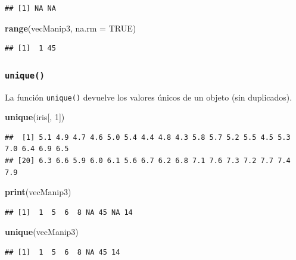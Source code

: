 \documentclass[
]{book}
\newenvironment{Shaded}{\begin{snugshade}}{\end{snugshade}}
\newcommand{\DataTypeTok}[1]{\textcolor[rgb]{0.13,0.29,0.53}{#1}}
\newcommand{\DecValTok}[1]{\textcolor[rgb]{0.00,0.00,0.81}{#1}}
\newcommand{\KeywordTok}[1]{\textcolor[rgb]{0.13,0.29,0.53}{\textbf{#1}}}
\newcommand{\NormalTok}[1]{#1}
\newcommand{\OtherTok}[1]{\textcolor[rgb]{0.56,0.35,0.01}{#1}}
\begin{document}
\begin{verbatim}
## [1] NA NA
\end{verbatim}

\begin{Shaded}
\begin{Highlighting}[]
\KeywordTok{range}\NormalTok{(vecManip3, }\DataTypeTok{na.rm =} \OtherTok{TRUE}\NormalTok{)}
\end{Highlighting}
\end{Shaded}

\begin{verbatim}
## [1]  1 45
\end{verbatim}

\hypertarget{l015unique}{%
\subsubsection{\texorpdfstring{\texttt{unique()}}{unique()}}\label{l015unique}}

La función \texttt{unique()} devuelve los valores únicos de un objeto (sin duplicados).

\begin{Shaded}
\begin{Highlighting}[]
\KeywordTok{unique}\NormalTok{(iris[, }\DecValTok{1}\NormalTok{])}
\end{Highlighting}
\end{Shaded}

\begin{verbatim}
##  [1] 5.1 4.9 4.7 4.6 5.0 5.4 4.4 4.8 4.3 5.8 5.7 5.2 5.5 4.5 5.3 7.0 6.4 6.9 6.5
## [20] 6.3 6.6 5.9 6.0 6.1 5.6 6.7 6.2 6.8 7.1 7.6 7.3 7.2 7.7 7.4 7.9
\end{verbatim}

\begin{Shaded}
\begin{Highlighting}[]
\KeywordTok{print}\NormalTok{(vecManip3)}
\end{Highlighting}
\end{Shaded}

\begin{verbatim}
## [1]  1  5  6  8 NA 45 NA 14
\end{verbatim}

\begin{Shaded}
\begin{Highlighting}[]
\KeywordTok{unique}\NormalTok{(vecManip3)}
\end{Highlighting}
\end{Shaded}

\begin{verbatim}
## [1]  1  5  6  8 NA 45 14
\end{verbatim}
\end{document}
